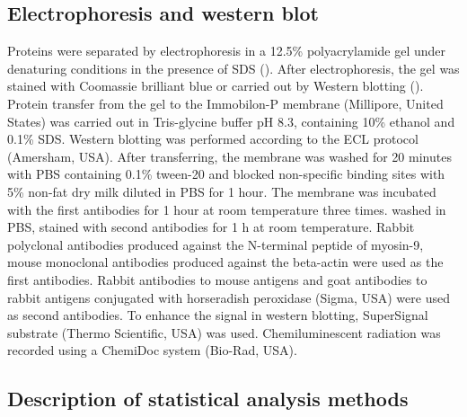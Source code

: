 \documentclass[english,authoryear]{elsarticle}
\begin{document}
\subsection{Electrophoresis and western blot}

Proteins were separated by electrophoresis in a 12.5\%  polyacrylamide gel under denaturing conditions in the presence of SDS (\cite{laemmli1970cleavage}).
After electrophoresis, the gel was stained with Coomassie brilliant blue or carried out by Western blotting (\cite{towbin1979electrophoretic}).
Protein transfer from the gel to the Immobilon-P membrane (Millipore, United States) was carried out in Tris-glycine buffer pH 8.3, containing 10\% ethanol and 0.1\% SDS.
Western blotting was performed according to the ECL protocol (Amersham, USA).
After transferring, the membrane was washed for 20 minutes with PBS containing 0.1\% tween-20 and blocked non-specific binding sites with 5\% non-fat dry milk diluted in PBS for 1 hour.
The membrane was incubated with the first antibodies for 1 hour at room temperature three times. washed in PBS, stained with second antibodies for 1 h at room temperature.
Rabbit polyclonal antibodies produced against the N-terminal peptide of myosin-9, mouse monoclonal antibodies produced against the beta-actin were used as the first antibodies.
Rabbit antibodies to mouse antigens and goat antibodies to rabbit antigens conjugated with horseradish peroxidase (Sigma, USA) were used as second antibodies.
To enhance the signal in western blotting, SuperSignal substrate (Thermo Scientific, USA) was used.
Chemiluminescent radiation was recorded using a ChemiDoc system (Bio-Rad, USA).


\subsection{Description of statistical analysis methods}
\end{document}
